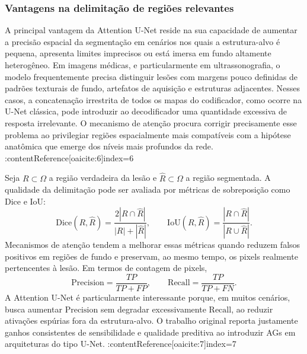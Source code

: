 \documentclass[tcc,capa]{texufpel}
\begin{document}
\subsubsection{Vantagens na delimitação de regiões relevantes}

A principal vantagem da Attention U-Net reside na sua capacidade de aumentar a precisão espacial da segmentação em cenários nos quais a estrutura-alvo é pequena, apresenta limites imprecisos ou está imersa em fundo altamente heterogêneo. Em imagens médicas, e particularmente em ultrassonografia, o modelo frequentemente precisa distinguir lesões com margens pouco definidas de padrões texturais de fundo, artefatos de aquisição e estruturas adjacentes. Nesses casos, a concatenação irrestrita de todos os mapas do codificador, como ocorre na U-Net clássica, pode introduzir ao decodificador uma quantidade excessiva de resposta irrelevante. O mecanismo de atenção procura corrigir precisamente esse problema ao privilegiar regiões espacialmente mais compatíveis com a hipótese anatômica que emerge dos níveis mais profundos da rede. :contentReference[oaicite:6]{index=6}

Seja \(R \subset \Omega\) a região verdadeira da lesão e \(\hat{R}\subset\Omega\) a região segmentada. A qualidade da delimitação pode ser avaliada por métricas de sobreposição como Dice e IoU:
\begin{equation}
	\mathrm{Dice}(R,\hat{R}) = \frac{2|R \cap \hat{R}|}{|R| + |\hat{R}|},
	\qquad
	\mathrm{IoU}(R,\hat{R}) = \frac{|R \cap \hat{R}|}{|R \cup \hat{R}|}.
\end{equation}
Mecanismos de atenção tendem a melhorar essas métricas quando reduzem falsos positivos em regiões de fundo e preservam, ao mesmo tempo, os pixels realmente pertencentes à lesão. Em termos de contagem de pixels,
\begin{equation}
	\mathrm{Precision} = \frac{TP}{TP+FP},
	\qquad
	\mathrm{Recall} = \frac{TP}{TP+FN}.
\end{equation}
A Attention U-Net é particularmente interessante porque, em muitos cenários, busca aumentar \(\mathrm{Precision}\) sem degradar excessivamente \(\mathrm{Recall}\), ao reduzir ativações espúrias fora da estrutura-alvo. O trabalho original reporta justamente ganhos consistentes de sensibilidade e qualidade preditiva ao introduzir AGs em arquiteturas do tipo U-Net. :contentReference[oaicite:7]{index=7}
\end{document}
